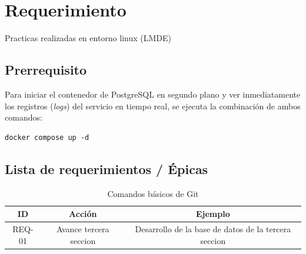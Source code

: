 \section{Requerimiento}

Practicas realizadas en entorno linux (LMDE)

\subsection{Prerrequisito}


Para iniciar el contenedor de PostgreSQL en segundo plano y ver inmediatamente los registros (\textit{logs}) del servicio en tiempo real, se ejecuta la combinación de ambos comandos:
\begin{verbatim}
docker compose up -d
\end{verbatim}

\subsection{Lista de requerimientos / Épicas}

    \begin{table}[h]
    \centering %
        \begin{tabular}{|c|c|c|} %
            \hline
            \textbf{ID}    &   \textbf{Acción}     &   \textbf{Ejemplo}        \\ \hline
            REQ-01         &   Avance tercera seccion  &   Desarrollo de la base de datos de la tercera seccion  \\ \hline
            
        \end{tabular}
    \caption{Comandos básicos de Git} %
    \end{table}